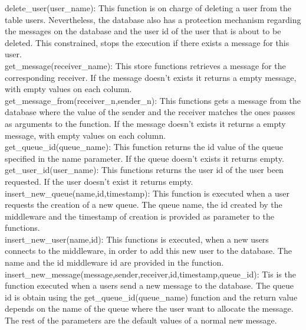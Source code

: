 delete\_user(user\_name): This function is on charge of deleting a user from the table users. Nevertheless, the database also has a protection mechanism regarding the messages on the database and the user id of the user that is about to be deleted. This constrained, stops the execution if there exists a message for this user.\\

get\_message(receiver\_name): This store functions retrieves a message for the corresponding receiver. If the message doesn’t exists it returns a empty message, with empty values on each column.\\

get\_message\_from(receiver\_n,sender\_n): This functions gets a message from the database where the value of the sender and the receiver matches the ones passes as arguments to the function. If the message doesn’t exists it returns a empty message, with empty values on each column.\\

get\_queue\_id(queue\_name): This function returns the id value of the queue specified in the name parameter. If the queue doesn’t exists it returns empty.
get\_user\_id(user\_name): This functions returns the user id of the user been requested. If the user doesn’t exist it returns empty.\\

insert\_new\_queue(name,id,timestamp): This function is executed when a user requests the creation of a new queue. The queue name, the id created by the middleware and the timestamp of creation is provided as parameter to the functions.\\

insert\_new\_user(name,id): This functions is executed, when a new users connects to the middleware, in order to add this new user to the database. The name and the id middleware id are provided in the function.\\

insert\_new\_message(message,sender,receiver,id,timestamp,queue\_id): Tis is the function executed when a users send a new message to the database. The queue id is obtain using the get\_queue\_id(queue\_name) function and the return value depends on the name of the queue where the user want to allocate the message. The rest of the parameters are the default values of a normal new message.


